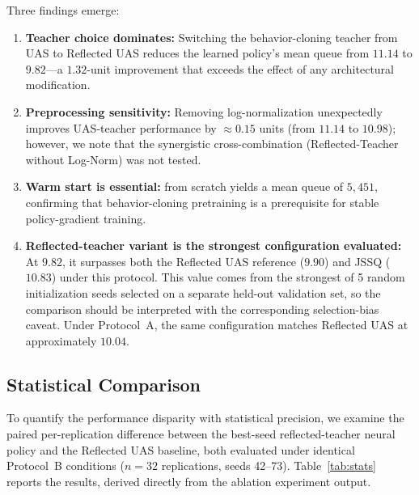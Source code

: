 Three findings emerge:
\begin{enumerate}
\item \textbf{Teacher choice dominates:}
  Switching the behavior-cloning teacher from UAS to Reflected UAS reduces the learned policy's mean queue from $11.14$ to $9.82$---a $1.32$-unit improvement that exceeds the effect of any architectural modification.
\item \textbf{Preprocessing sensitivity:}
  Removing log-normalization unexpectedly improves UAS-teacher performance by $\approx 0.15$ units (from $11.14$ to $10.98$); however, we note that the synergistic cross-combination (Reflected-Teacher without Log-Norm) was not tested.
\item \textbf{Warm start is essential:}
  \reinforce{} from scratch yields a mean queue of $5{,}451$, confirming that behavior-cloning pretraining is a prerequisite for stable policy-gradient training.
\item \textbf{Reflected-teacher variant is the strongest configuration evaluated:}
  At $9.82$, it surpasses both the Reflected UAS reference ($9.90$) and JSSQ ($10.83$) under this protocol. This value comes from the strongest of 5 random initialization seeds selected on a separate held-out validation set, so the comparison should be interpreted with the corresponding selection-bias caveat. Under Protocol~A, the same configuration matches Reflected UAS at approximately $10.04$.
\end{enumerate}

\subsection{Statistical Comparison}
\label{sec:exp:stats}

To quantify the performance disparity with statistical precision, we examine the paired per-replication difference between the best-seed reflected-teacher neural policy and the Reflected UAS baseline, both evaluated under identical Protocol~B conditions ($n{=}32$ replications, seeds 42--73). Table~\ref{tab:stats} reports the results, derived directly from the ablation experiment output.

